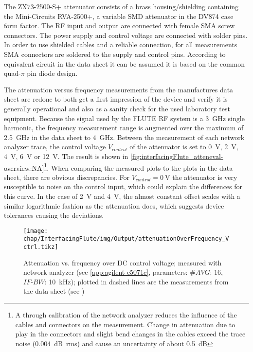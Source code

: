 The ZX73-2500-S+ attenuator consists of a brass housing/shielding containing the Mini-Circuits RVA-2500+, a variable SMD attenuator in the DV874 case form factor. The RF input and output are connected with female SMA screw connectors. The power supply and control voltage are connected with solder pins. In order to use shielded cables and a reliable connection, for all measurements SMA connectors are soldered to the supply and control pins. According to equivalent circuit in the data sheet\cite{mini-circuitsZX732500VoltageVariable} it can be assumed it is based on the common quad-$\pi$ pin diode design\cite{waughLowCostSurfaceMount1992}.

The attenuation versus frequency measurements from the manufactures data sheet are redone to both get a first impression of the device and verify it is generally operational and also as a sanity check for the used laboratory test equipment.
Because the signal used by the FLUTE RF system is a \SI{3}{\GHz} single harmonic, the frequency measurement range is augmented over the maximum of \SI{2.5}{\GHz} in the data sheet to \SI{4}{\GHz}.
Between the measurement of each network analyzer trace, the control voltage $V_{control}$ of the attenuator is set to \SI{0}{\volt}, \SI{2}{\volt}, \SI{4}{\volt}, \SI{6}{\volt} or \SI{12}{\volt}.
The result is shown in \autoref{fig:interfacingFlute_atteneval-overview-NA}\footnote{A through calibration of the network analyzer reduces the influence of the cables and connectors on the measurement. Change in attenuation due to play in the connectors and slight bend changes in the cables exceed the trace noise (\SI{0.004}{\dB rms}) and cause an uncertainty of about \SI{0.5}{\dB}}.
When comparing the measured plots to the plots in the data sheet, there are obvious discrepancies. For $V_{control}=\SI{0}{\volt}$ the attenuator is very susceptible to noise on the control input, which could explain the differences for this curve. In the case of \SI{2}{\volt} and \SI{4}{\volt}, the almost constant offset scales with a similar logarithmic fashion as the attenuation does, which suggests device tolerances causing the deviations.

\begin{figure}[tb]
	\centering
	\texttt{[image: chap/InterfacingFlute/img/Output/attenuationOverFrequency\_Vctrl.tikz]}
	\caption{Attenuation vs. frequency over DC control voltage; measured with network analyzer (see \ref{app:agilent-e5071c}, parameters: $\#AVG$: 16, $IF\text{-}BW$: \SI{10}{\kHz}); plotted in dashed lines are the measurements from the data sheet (see \cite[p.~2]{mini-circuitsZX732500VoltageVariable})}
	\label{fig:interfacingFlute_atteneval-overview-NA}
\end{figure}

